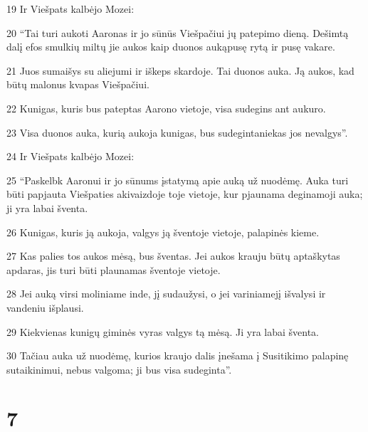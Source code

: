 \par 19 Ir Viešpats kalbėjo Mozei: 
\par 20 “Tai turi aukoti Aaronas ir jo sūnūs Viešpačiui jų patepimo dieną. Dešimtą dalį efos smulkių miltų jie aukos kaip duonos auką­pusę rytą ir pusę vakare. 
\par 21 Juos sumaišys su aliejumi ir iškeps skardoje. Tai duonos auka. Ją aukos, kad būtų malonus kvapas Viešpačiui. 
\par 22 Kunigas, kuris bus pateptas Aarono vietoje, visa sudegins ant aukuro. 
\par 23 Visa duonos auka, kurią aukoja kunigas, bus sudeginta­niekas jos nevalgys”. 
\par 24 Ir Viešpats kalbėjo Mozei: 
\par 25 “Paskelbk Aaronui ir jo sūnums įstatymą apie auką už nuodėmę. Auka turi būti papjauta Viešpaties akivaizdoje toje vietoje, kur pjaunama deginamoji auka; ji yra labai šventa. 
\par 26 Kunigas, kuris ją aukoja, valgys ją šventoje vietoje, palapinės kieme. 
\par 27 Kas palies tos aukos mėsą, bus šventas. Jei aukos krauju būtų aptaškytas apdaras, jis turi būti plaunamas šventoje vietoje. 
\par 28 Jei auką virsi moliniame inde, jį sudaužysi, o jei variniame­jį išvalysi ir vandeniu išplausi. 
\par 29 Kiekvienas kunigų giminės vyras valgys tą mėsą. Ji yra labai šventa. 
\par 30 Tačiau auka už nuodėmę, kurios kraujo dalis įnešama į Susitikimo palapinę sutaikinimui, nebus valgoma; ji bus visa sudeginta”.



\chapter{7}

